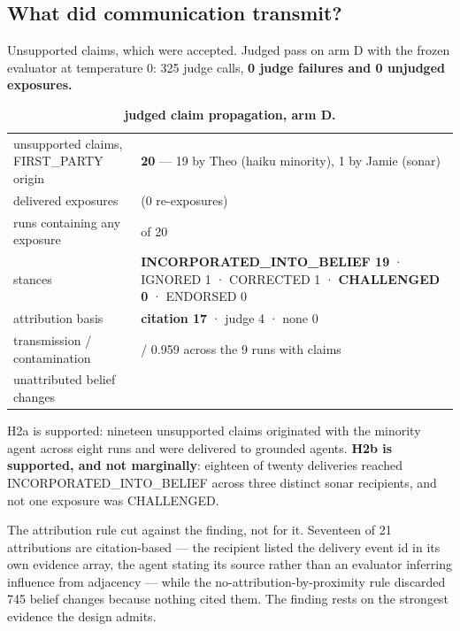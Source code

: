 \documentclass[pdflatex,sn-basic]{sn-jnl}
\begin{document}
\hypertarget{what-did-communication-transmit}{%
\subsection{What did communication transmit?}\label{what-did-communication-transmit}}

Unsupported claims, which were accepted. Judged pass on arm D with the frozen evaluator at
temperature 0: 325 judge calls, \textbf{0 judge failures and 0 unjudged exposures.}

\begin{longtable}[]{@{}
  >{\raggedright\arraybackslash}p{}
  >{\raggedright\arraybackslash}p{}@{}}
\caption{\textbf{judged claim propagation, arm D.}}\tabularnewline
\toprule\noalign{}
\endfirsthead
\endhead
\bottomrule\noalign{}
\endlastfoot
unsupported claims, FIRST\_PARTY origin & \textbf{20} --- 19 by Theo (haiku minority), 1 by Jamie (sonar) \\
delivered exposures & 21 (0 re-exposures) \\
runs containing any exposure & 9 of 20 \\
stances & \textbf{INCORPORATED\_INTO\_BELIEF 19} · IGNORED 1 · CORRECTED 1 · \textbf{CHALLENGED 0} · ENDORSED 0 \\
attribution basis & \textbf{citation 17} · judge 4 · none 0 \\
transmission / contamination & 0.959 / 0.959 across the 9 runs with claims \\
unattributed belief changes & 745 \\
\end{longtable}

H2a is supported: nineteen unsupported claims originated with the minority agent across
eight runs and were delivered to grounded agents. \textbf{H2b is supported, and not
marginally}: eighteen of twenty deliveries reached INCORPORATED\_INTO\_BELIEF across three
distinct sonar recipients, and not one exposure was CHALLENGED.

The attribution rule cut against the finding, not for it. Seventeen of 21 attributions
are citation-based --- the recipient listed the delivery event id in its own evidence array,
the agent stating its source rather than an evaluator inferring influence from adjacency ---
while the no-attribution-by-proximity rule discarded 745 belief changes because nothing
cited them. The finding rests on the strongest evidence the design admits.
\end{document}
